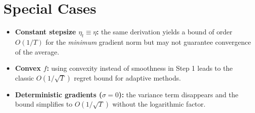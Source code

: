\documentclass{article}
\begin{document}
\section*{Special Cases}
\begin{itemize}
\item \textbf{Constant stepsize $\eta_t\equiv\eta$:} the same derivation yields a bound of order $O(1/T)$ for the \emph{minimum} gradient norm but may not guarantee convergence of the average.
\item \textbf{Convex $f$:} using convexity instead of smoothness in Step 1 leads to the classic $O(1/\sqrt{T})$ regret bound for adaptive methods.
\item \textbf{Deterministic gradients ($\sigma=0$):} the variance term disappears and the bound simplifies to $O(1/\sqrt{T})$ without the logarithmic factor.
\end{itemize}
\end{document}
